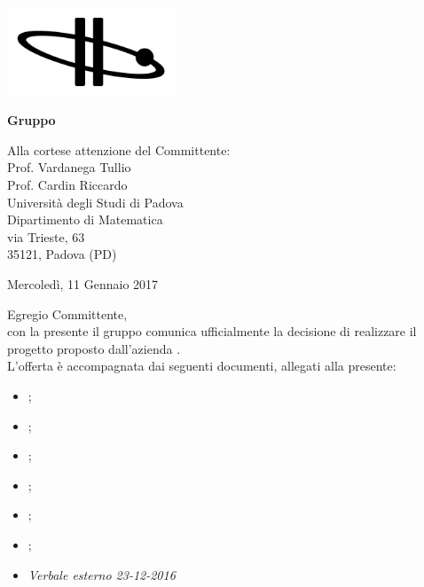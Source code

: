   
	\begin{titlepage}
	
	\begin{center}
	 	
	\includegraphics[width=5cm]{../../modello/or-bit_bkg_minBorder.png} 
	\begin{Huge} 
	 	\textbf{Gruppo \GroupName{}}
	\end{Huge}
	\end{center}
	
	\vspace{1cm}
	\begin{large}
	\begin{flushright}
		Alla cortese attenzione del Committente: \\
		Prof. Vardanega Tullio \\
		Prof. Cardin Riccardo \\
		Università degli Studi di Padova \\
		Dipartimento di Matematica \\
		via Trieste, 63 \\
		35121, Padova (PD) 
		
		\vspace{0,5cm}
		
		Mercoledì, 11 Gennaio 2017
	\end{flushright}

	\vspace{1cm}
	
	Egregio Committente, \\
	con la presente il gruppo \GroupName{} comunica ufficialmente la decisione di realizzare il progetto \ProjectName{} proposto dall'azienda \Proponente{}.\\
	
	
	L'offerta è accompagnata dai seguenti documenti, allegati alla presente:
	\begin{itemize}
		\item \AnalisiDeiRequisiti{};
		\item \Glossario{};
		\item \NormeDiProgetto{};
		\item \PianoDiProgetto{};
		\item \PianoDiQualifica{};
		\item \StudioDiFattibilita{};
		\item \emph{Verbale esterno 23-12-2016}
	\end{itemize}
	

\end{large}
\end{titlepage}
